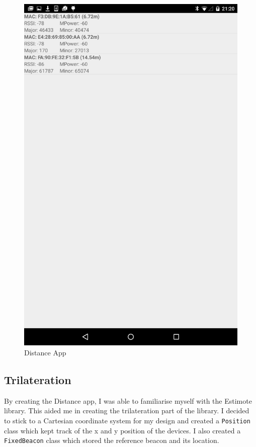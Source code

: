 \begin{figure}[h]
  \includegraphics[scale=0.2]{images/distance}
  \protect\caption{Distance App} 
  \label{distance_app_image}
\end{figure}

\subsection{Trilateration} \label{nocamera_trilateration}

By creating the Distance app, I was able to familiarise myself with the Estimote library. This aided me in creating the trilateration part of the library. I decided to stick to a Cartesian coordinate system for my design and created a \lstinline|Position| class which kept track of the x and y position of the devices. I also created a \lstinline|FixedBeacon| class which stored the reference beacon and its location.

